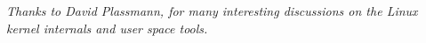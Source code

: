 \documentclass[a4paper,oneside]{book}
\begin{document}

\maketitle
\thispagestyle{first} %

\newpage

\thispagestyle{first} %

\vspace*{\fill}

\vspace{-1cm}

\begin{center}

\emph{Thanks to David Plassmann, for many interesting discussions on the Linux
kernel internals and user space tools.}

\end{center}

\vspace*{\fill}

\tableofcontents

\clearpage

\setcounter{chapter}{-1}







%

%











\appendix



\printglossaries
\end{document}
